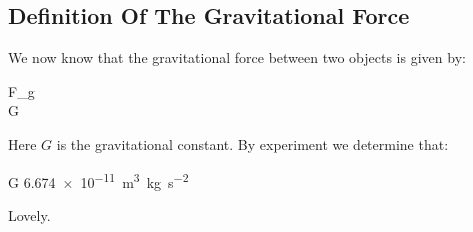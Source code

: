 \subsection{Definition Of The Gravitational Force}

We now know that the gravitational force between two objects is given
by:

\begin{nedqn}
  F_g
\simcol
\\
\eqcol
  G
\end{nedqn}

Here $G$ is the gravitational constant. By experiment we determine that:

\begin{nedqn}
  G
\eqcol
  \SI{6.674e-11}{m^3.kg.s^{-2}}
\end{nedqn}

Lovely.
